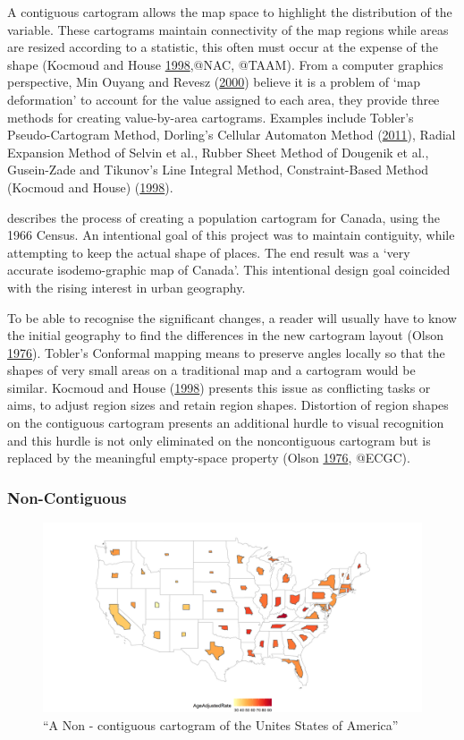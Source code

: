 \documentclass[11pt,]{article}
\begin{document}
A contiguous cartogram allows the map space to highlight the
distribution of the variable. These cartograms maintain connectivity of
the map regions while areas are resized according to a statistic, this
often must occur at the expense of the shape (Kocmoud and House
\protect\hyperlink{ref-CBATCC}{1998},@NAC, @TAAM). From a computer
graphics perspective, Min Ouyang and Revesz
(\protect\hyperlink{ref-ACA}{2000}) believe it is a problem of `map
deformation' to account for the value assigned to each area, they
provide three methods for creating value-by-area cartograms. Examples
include Tobler's Pseudo-Cartogram Method, Dorling's Cellular Automaton
Method (\protect\hyperlink{ref-ACTUC}{2011}), Radial Expansion Method of
Selvin et al., Rubber Sheet Method of Dougenik et al., Gusein-Zade and
Tikunov's Line Integral Method, Constraint-Based Method (Kocmoud and
House) (\protect\hyperlink{ref-CBATCC}{1998}).

describes the process of creating a population cartogram for Canada,
using the 1966 Census. An intentional goal of this project was to
maintain contiguity, while attempting to keep the actual shape of
places. The end result was a `very accurate isodemo-graphic map of
Canada'. This intentional design goal coincided with the rising interest
in urban geography.

To be able to recognise the significant changes, a reader will usually
have to know the initial geography to find the differences in the new
cartogram layout (Olson \protect\hyperlink{ref-NAC}{1976}). Tobler's
Conformal mapping means to preserve angles locally so that the shapes of
very small areas on a traditional map and a cartogram would be similar.
Kocmoud and House (\protect\hyperlink{ref-CBATCC}{1998}) presents this
issue as conflicting tasks or aims, to adjust region sizes and retain
region shapes. Distortion of region shapes on the contiguous cartogram
presents an additional hurdle to visual recognition and this hurdle is
not only eliminated on the noncontiguous cartogram but is replaced by
the meaningful empty-space property (Olson
\protect\hyperlink{ref-NAC}{1976}, @ECGC).

\hypertarget{non-contiguous}{%
\subsubsection{Non-Contiguous}\label{non-contiguous}}

\begin{figure}
\centering
\includegraphics{figures/ggncont.png}
\caption{``A Non - contiguous cartogram of the Unites States of
America''}
\end{figure}
\end{document}
